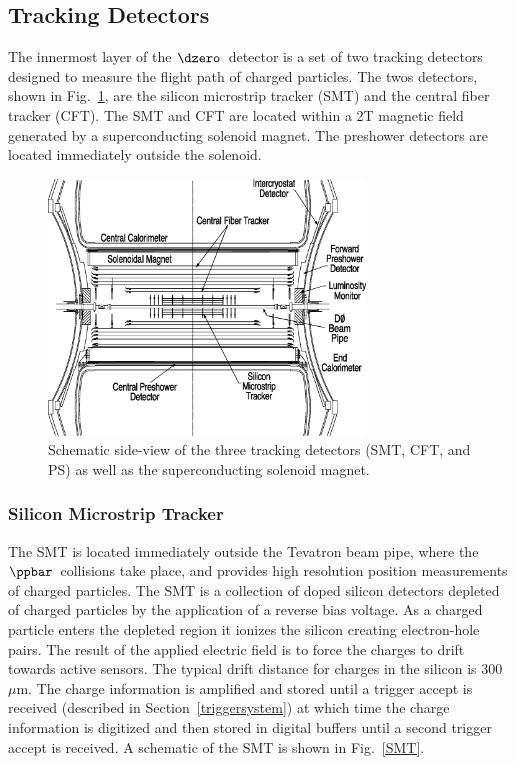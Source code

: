 \subsection{Tracking Detectors}
\label{tracking}

The innermost layer of the $\dzero$~detector is a set of two tracking detectors designed to measure the flight path of charged particles. The twos detectors, shown in Fig.~\ref{InnerDetector}, are the silicon microstrip tracker (SMT) and the central fiber tracker (CFT). The SMT and CFT are located within a 2T magnetic field generated by a superconducting solenoid magnet. The preshower detectors are located immediately outside the solenoid.


\begin{figure}[!h!tbp]
\begin{center}
\includegraphics[width=0.75\textwidth]{eps/D0/InnerDetector.eps}
\end{center}
\vspace{-0.1in}
\caption{Schematic side-view of the three tracking detectors (SMT, CFT, and PS) as well as the superconducting solenoid magnet.}
\label{InnerDetector}
\end{figure}

\subsubsection{Silicon Microstrip Tracker}

The SMT is located immediately outside the Tevatron beam pipe, where the $\ppbar$~collisions take place, and provides high resolution position measurements of charged particles. The SMT is a collection of doped silicon detectors depleted of charged particles by the application of a reverse bias voltage. As a charged particle enters the depleted region it ionizes the silicon creating electron-hole pairs. The result of the applied electric field is to force the charges to drift towards active sensors. The typical drift distance for charges in the silicon is $300$~$\mu$m. The charge information is amplified and stored until a trigger accept is received (described in Section~\ref{triggersystem}) at which time the charge information is digitized and then stored in digital buffers until a second trigger accept is received. A schematic of the SMT is shown in Fig.~\ref{SMT}.


